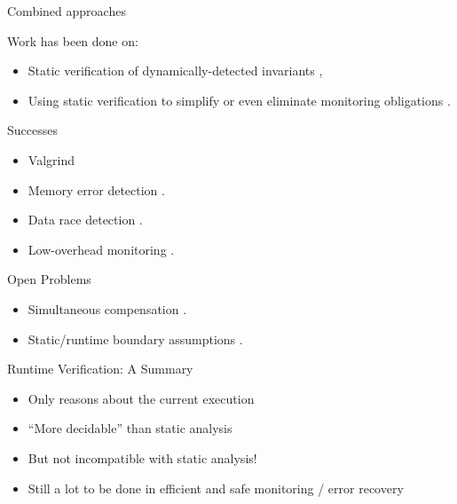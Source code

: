 \documentclass[12pt]{beamer}
\begin{document}
\begin{frame}{Combined approaches}

  Work has been done on:

  \begin{itemize}
    \item Static verification of dynamically-detected
      invariants \parencite{statver},

    \item Using static verification to simplify or even eliminate
      monitoring obligations \parencite{unified}.
  \end{itemize}
\end{frame}

\begin{frame}{Successes}

  \begin{itemize}
    \item Valgrind \parencite{valgrind}
    \item Memory error detection \parencite{addrsan}.
    \item Data race detection \parencite{datarace}.
    \item Low-overhead monitoring \parencite{compensate}.
  \end{itemize}
\end{frame}

\begin{frame}{Open Problems}
  \begin{itemize}
    \item Simultaneous compensation \parencite{compensate}.
    \item Static/runtime boundary assumptions \parencite{explicit}.
  \end{itemize}
\end{frame}

\begin{frame}{Runtime Verification: \small A Summary}
  \begin{itemize}
    \item<1-> Only reasons about the current execution
    \item<1-> ``More decidable'' than static analysis
    \item<2-> But not incompatible with static analysis!
    \item<3-> Still a lot to be done in efficient and safe monitoring
      / error recovery
  \end{itemize}
\end{frame}
\end{document}
